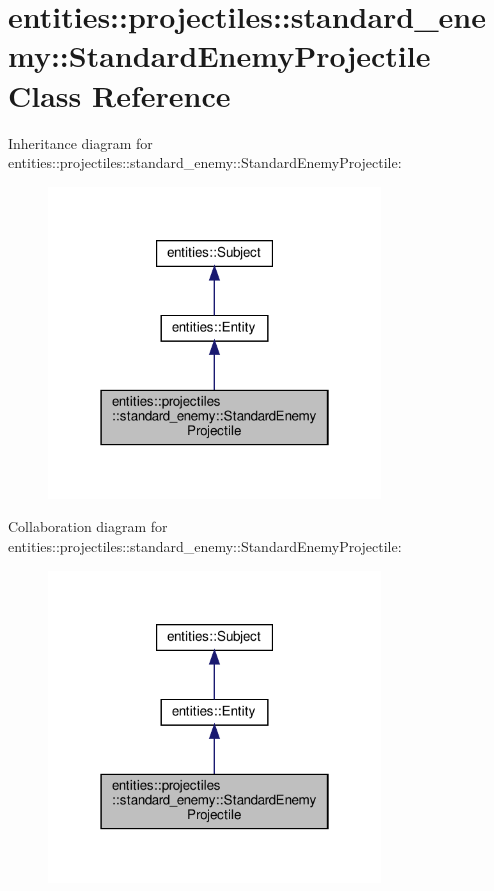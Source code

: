 \hypertarget{classentities_1_1projectiles_1_1standard__enemy_1_1StandardEnemyProjectile}{}\section{entities\+:\+:projectiles\+:\+:standard\+\_\+enemy\+:\+:Standard\+Enemy\+Projectile Class Reference}
\label{classentities_1_1projectiles_1_1standard__enemy_1_1StandardEnemyProjectile}


Inheritance diagram for entities\+:\+:projectiles\+:\+:standard\+\_\+enemy\+:\+:Standard\+Enemy\+Projectile\+:\nopagebreak
\begin{figure}[H]
\begin{center}
\leavevmode
\includegraphics[width=250pt]{classentities_1_1projectiles_1_1standard__enemy_1_1StandardEnemyProjectile__inherit__graph}
\end{center}
\end{figure}


Collaboration diagram for entities\+:\+:projectiles\+:\+:standard\+\_\+enemy\+:\+:Standard\+Enemy\+Projectile\+:\nopagebreak
\begin{figure}[H]
\begin{center}
\leavevmode
\includegraphics[width=250pt]{classentities_1_1projectiles_1_1standard__enemy_1_1StandardEnemyProjectile__coll__graph}
\end{center}
\end{figure}
